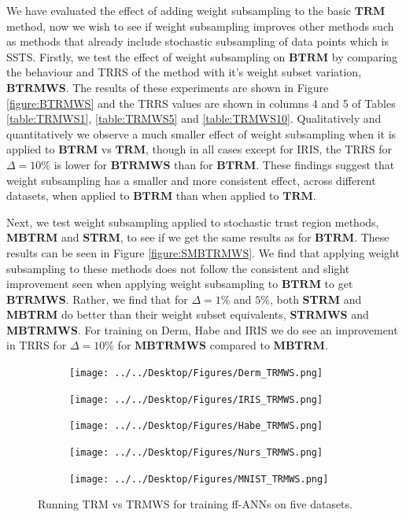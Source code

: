 \documentclass[letterpaper,12pt,titlepage,oneside,final]{book}
\begin{document}
		We have evaluated the effect of adding weight subsampling to the basic $\mathbf{TRM}$ method, now we wish to see if weight subsampling improves other methods such as methods that already include stochastic subsampling of data points which is SSTS. Firstly, we test the effect of weight subsampling on $\mathbf{BTRM}$ by comparing the behaviour and TRRS of the method with it's weight subset variation, $\mathbf{BTRMWS}$. The results of these experiments are shown in Figure \ref{figure:BTRMWS} and the TRRS values are shown in columns 4 and 5 of Tables \ref{table:TRMWS1}, \ref{table:TRMWS5} and \ref{table:TRMWS10}. Qualitatively and quantitatively we observe a much smaller effect of weight subsampling when it is applied to $\mathbf{BTRM}$ vs $\mathbf{TRM}$, though in all cases except for IRIS, the TRRS for $\Delta=10\%$ is lower for $\mathbf{BTRMWS}$ than for $\mathbf{BTRM}$. These findings suggest that weight subsampling has a smaller and more consistent effect, across different datasets, when applied to $\mathbf{BTRM}$ than when applied to $\mathbf{TRM}$. 
	
	Next, we test weight subsampling applied to stochastic trust region methods, \textbf{MBTRM} and \textbf{STRM}, to see if we get the same results as for $\mathbf{BTRM}$. These results can be seen in Figure \ref{figure:SMBTRMWS}. We find that applying weight subsampling to these methods does not follow the consistent and slight improvement seen when applying weight subsampling to $\mathbf{BTRM}$ to get $\mathbf{BTRMWS}$. Rather, we find that for $\Delta=1 \%$ and $5\%$, both \textbf{STRM} and \textbf{MBTRM} do better than their weight subset equivalents, \textbf{STRMWS} and \textbf{MBTRMWS}. For training on Derm, Habe and IRIS we do see an improvement in TRRS for $\Delta=10\%$ for $\mathbf{MBTRMWS}$ compared to \textbf{MBTRM}. 
	
	\begin{figure}
		\centering
		\begin{subfigure}{.45\textwidth}
			\texttt{[image: ../../Desktop/Figures/Derm\_TRMWS.png]}
		\end{subfigure}
		\begin{subfigure}{.45\textwidth}
			\texttt{[image: ../../Desktop/Figures/IRIS\_TRMWS.png]}
		\end{subfigure}
		\begin{subfigure}{.45\textwidth}
			\texttt{[image: ../../Desktop/Figures/Habe\_TRMWS.png]}
		\end{subfigure}
		\begin{subfigure}{.45\textwidth}
			\texttt{[image: ../../Desktop/Figures/Nurs\_TRMWS.png]}
		\end{subfigure}
		\begin{subfigure}{.45\textwidth}
			\texttt{[image: ../../Desktop/Figures/MNIST\_TRMWS.png]}
		\end{subfigure}
		\caption{Running TRM vs TRMWS for training ff-ANNs on five datasets.}
		\label{figure:TRMWS}
	\end{figure}
	
\end{document}
